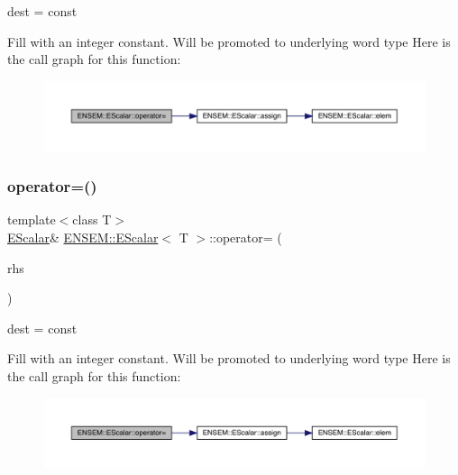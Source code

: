 dest = const 

Fill with an integer constant. Will be promoted to underlying word type Here is the call graph for this function\+:
\nopagebreak
\begin{figure}[H]
\begin{center}
\leavevmode
\includegraphics[width=350pt]{d0/d82/classENSEM_1_1EScalar_a01ae8ddc1b0d0e4ecd65f5de624faee5_cgraph}
\end{center}
\end{figure}
\mbox{\label{classENSEM_1_1EScalar_a01ae8ddc1b0d0e4ecd65f5de624faee5}} 
\subsubsection{\texorpdfstring{operator=()}{operator=()}\hspace{0.1cm}{\footnotesize\ttfamily [2/12]}}
{\footnotesize\ttfamily template$<$class T$>$ \\
\mbox{\hyperlink{classENSEM_1_1EScalar}{E\+Scalar}}\& \mbox{\hyperlink{classENSEM_1_1EScalar}{E\+N\+S\+E\+M\+::\+E\+Scalar}}$<$ T $>$\+::operator= (\begin{DoxyParamCaption}\item[{const typename \mbox{\hyperlink{structENSEM_1_1WordType}{Word\+Type}}$<$ T $>$\+::Type\+\_\+t \&}]{rhs }\end{DoxyParamCaption})\hspace{0.3cm}{\ttfamily [inline]}}



dest = const 

Fill with an integer constant. Will be promoted to underlying word type Here is the call graph for this function\+:
\nopagebreak
\begin{figure}[H]
\begin{center}
\leavevmode
\includegraphics[width=350pt]{d0/d82/classENSEM_1_1EScalar_a01ae8ddc1b0d0e4ecd65f5de624faee5_cgraph}
\end{center}
\end{figure}
\mbox{\label{classENSEM_1_1EScalar_a01ae8ddc1b0d0e4ecd65f5de624faee5}} 
